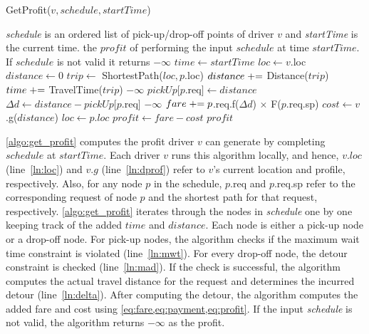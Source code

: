 \vspace{-2mm}
\begin{algorithm}
	\caption{GetProfit($v, schedule, startTime$)}
	\label{algo:get_profit}
	\begin{algorithmic}[1]
		\REQUIRE \emph{schedule} is an ordered list of pick-up/drop-off points of driver $v$ and \emph{startTime} is the current time.
		\ENSURE the $profit$ of performing the input $schedule$ at time $startTime$. If $schedule$ is not valid it returns $-\infty$
		\STATE $time \leftarrow startTime$
		\STATE $loc \leftarrow v.$loc\label{ln:loc}
		\STATE $distance \leftarrow 0$
		\STATE $trip \leftarrow$ ShortestPath($loc, p$.loc)
		\STATE $distance \mathrel{+}=$ Distance($trip$)
		\STATE $time \mathrel{+}=$ TravelTime($trip$)
		\label{ln:mwt}
		\RETURN $-\infty$
		\ENDIF
		\STATE $pickUp[p$.req$]\leftarrow distance$
		\ENDIF
		\STATE $\Delta d \leftarrow distance - pickUp[p$.req$]$
		\label{ln:mad}
		\RETURN $-\infty$
		\ENDIF
		\STATE $fare \mathrel{+}= p$.req.f($\Delta d$) $\times$ F($p$.req.sp)\label{ln:delta}
		\STATE $cost \leftarrow v$.g($distance$)\label{ln:dprof}
		\ENDIF
		\STATE $loc \leftarrow p.loc$
		\ENDFOR
		\STATE $profit \leftarrow fare - cost$
		\RETURN $profit$
	\end{algorithmic} 
\end{algorithm}

\cref{algo:get_profit} computes the profit driver $v$ can generate by completing $schedule$ at $startTime$. Each driver $v$ runs this algorithm locally, and hence, $v.loc$ (line~\ref{ln:loc}) and $v.g$ (line~\ref{ln:dprof}) refer to $v$'s current location and profile, respectively. Also, for any node $p$ in the schedule, $p$.req and $p$.req.sp refer to the corresponding request of node $p$ and the shortest path for that request, respectively. \cref{algo:get_profit} iterates through the nodes in \textit{schedule} one by one keeping track of the added $time$ and $distance$. Each node is either a pick-up node or a drop-off node. For pick-up nodes, the algorithm checks if the maximum wait time constraint is violated (line~\ref{ln:mwt}). For every drop-off node, the detour constraint is checked (line~\ref{ln:mad}). If the check is successful, the algorithm computes the actual travel distance for the request and determines the incurred detour (line~\ref{ln:delta}). After computing the detour, the algorithm computes the added fare and cost using \cref{eq:fare,eq:payment,eq:profit}. If the input \textit{schedule} is not valid, the algorithm returns $-\infty$ as the profit.

